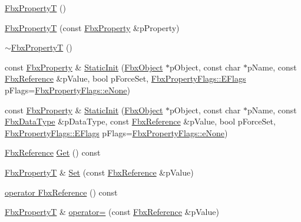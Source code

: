 \begin{DoxyCompactItemize}
\item 
\hyperlink{class_fbx_property_t_3_01_fbx_reference_01_4_a0e52b59786dc43fcc7e6dc078fb4d609}{Fbx\+PropertyT} ()
\item 
\hyperlink{class_fbx_property_t_3_01_fbx_reference_01_4_a5fadc2ddbd221db69d2907c4745ec6b8}{Fbx\+PropertyT} (const \hyperlink{class_fbx_property}{Fbx\+Property} \&p\+Property)
\item 
\hyperlink{class_fbx_property_t_3_01_fbx_reference_01_4_ab4d98649c0348f55f31f43302a41a7b0}{$\sim$\+Fbx\+PropertyT} ()
\item 
const \hyperlink{class_fbx_property}{Fbx\+Property} \& \hyperlink{class_fbx_property_t_3_01_fbx_reference_01_4_ae40af651436b9b3df5bbb049e512421d}{Static\+Init} (\hyperlink{class_fbx_object}{Fbx\+Object} $\ast$p\+Object, const char $\ast$p\+Name, const \hyperlink{fbxtypes_8h_a44df6a2eec915cf27cd481e5c5e48a24}{Fbx\+Reference} \&p\+Value, bool p\+Force\+Set, \hyperlink{class_fbx_property_flags_afabfa7e0949aac8a7dcdf8a141867e99}{Fbx\+Property\+Flags\+::\+E\+Flags} p\+Flags=\hyperlink{class_fbx_property_flags_afabfa7e0949aac8a7dcdf8a141867e99ac1b9aab93d40af76eb419be426de17b1}{Fbx\+Property\+Flags\+::e\+None})
\item 
const \hyperlink{class_fbx_property}{Fbx\+Property} \& \hyperlink{class_fbx_property_t_3_01_fbx_reference_01_4_ae6f72c54ae167513f7975c56bfeb0281}{Static\+Init} (\hyperlink{class_fbx_object}{Fbx\+Object} $\ast$p\+Object, const char $\ast$p\+Name, const \hyperlink{class_fbx_data_type}{Fbx\+Data\+Type} \&p\+Data\+Type, const \hyperlink{fbxtypes_8h_a44df6a2eec915cf27cd481e5c5e48a24}{Fbx\+Reference} \&p\+Value, bool p\+Force\+Set, \hyperlink{class_fbx_property_flags_afabfa7e0949aac8a7dcdf8a141867e99}{Fbx\+Property\+Flags\+::\+E\+Flags} p\+Flags=\hyperlink{class_fbx_property_flags_afabfa7e0949aac8a7dcdf8a141867e99ac1b9aab93d40af76eb419be426de17b1}{Fbx\+Property\+Flags\+::e\+None})
\item 
\hyperlink{fbxtypes_8h_a44df6a2eec915cf27cd481e5c5e48a24}{Fbx\+Reference} \hyperlink{class_fbx_property_t_3_01_fbx_reference_01_4_a91552cfa2847dc9bd6ec37dff19f1e67}{Get} () const
\item 
\hyperlink{class_fbx_property_t}{Fbx\+PropertyT} \& \hyperlink{class_fbx_property_t_3_01_fbx_reference_01_4_a7d67d93829ab10066d0f7814a676f3c3}{Set} (const \hyperlink{fbxtypes_8h_a44df6a2eec915cf27cd481e5c5e48a24}{Fbx\+Reference} \&p\+Value)
\item 
\hyperlink{class_fbx_property_t_3_01_fbx_reference_01_4_a5c5065932e01bfc6bffb87e6aad34ddf}{operator Fbx\+Reference} () const
\item 
\hyperlink{class_fbx_property_t}{Fbx\+PropertyT} \& \hyperlink{class_fbx_property_t_3_01_fbx_reference_01_4_a84a5262ef5dc13b09eb598d554949ce7}{operator=} (const \hyperlink{fbxtypes_8h_a44df6a2eec915cf27cd481e5c5e48a24}{Fbx\+Reference} \&p\+Value)
\end{DoxyCompactItemize}
